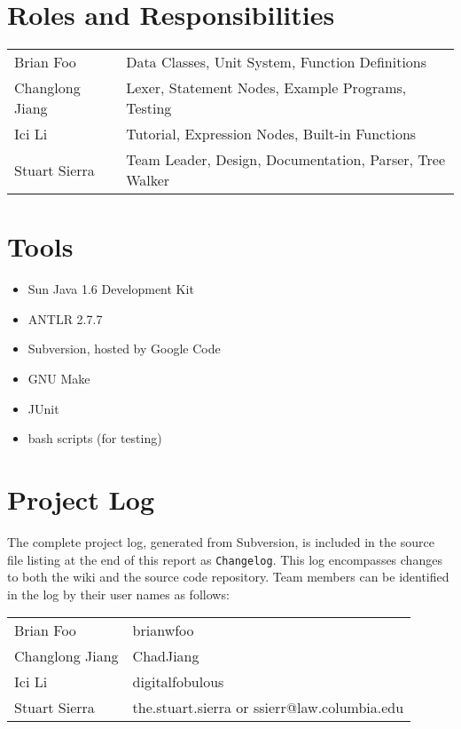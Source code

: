 \section{Roles and Responsibilities}

\begin{tabular}{ll}
Brian Foo       & Data Classes, Unit System, Function Definitions \\
Changlong Jiang & Lexer, Statement Nodes, Example Programs, Testing \\
Ici Li          & Tutorial, Expression Nodes, Built-in Functions \\
Stuart Sierra   & Team Leader, Design, Documentation, Parser, Tree Walker
\end{tabular}



\section{Tools}

\begin{itemize}
\item Sun Java 1.6 Development Kit
\item ANTLR 2.7.7
\item Subversion, hosted by Google Code
\item GNU Make
\item JUnit
\item bash scripts (for testing)
\end{itemize}


\section{Project Log}

The complete project log, generated from Subversion, is included in
the source file listing at the end of this report as
\texttt{Changelog}.  This log encompasses changes to both the wiki and
the source code repository.  Team members can be identified in the log
by their user names as follows:

\vspace{1em}
\begin{tabular}{ll}
Brian Foo       & brianwfoo \\
Changlong Jiang & ChadJiang \\
Ici Li          & digitalfobulous \\
Stuart Sierra   & the.stuart.sierra or ssierr@law.columbia.edu \\
\end{tabular}
